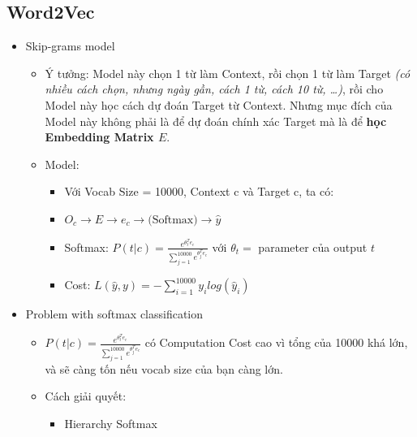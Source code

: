 \documentclass[12pt,a4paper]{report}
\begin{document}
		\subsection{Word2Vec}
			\begin{itemize}
			\item Skip-grams model
				\begin{itemize}
				\item Ý tưởng: Model này chọn 1 từ làm Context, rồi chọn 1 từ làm Target \textit{(có nhiều cách chọn, nhưng ngày gần, cách 1 từ, cách 10 từ, \dots)}, rồi cho Model này học cách dự đoán Target từ Context. Nhưng mục đích của Model này không phải là để dự đoán chính xác Target mà là để \textbf{học Embedding Matrix $E$}.
				\item Model: 
					\begin{itemize}
					\item Với Vocab Size = 10000, Context c và Target c, ta có:
					\item $O_c \rightarrow E \rightarrow e_c \rightarrow \text{(Softmax)} \rightarrow \hat{y}$
					\item Softmax: $P(t|c)=\frac{e^{\theta^T_t e_c}}{\sum^{10000}_{j=1}e^{\theta^T_j e_c}}$ với $\theta_t = $ parameter của output $t$
					\item Cost: $L(\hat{y},y)=-\sum_{i=1}^{10000}y_ilog(\hat{y}_i)$
					\end{itemize}
				\end{itemize}
			\item Problem with softmax classification
				\begin{itemize}
				\item $P(t|c)=\frac{e^{\theta^T_t e_c}}{\sum^{10000}_{j=1}e^{\theta^T_j e_c}}$ có Computation Cost cao vì tổng của 10000 khá lớn, và sẽ càng tốn nếu vocab size của bạn càng lớn.
				\item Cách giải quyết:
					\begin{itemize}
					\item Hierarchy Softmax
					\end{itemize}
				\end{itemize}
			\end{itemize}
\end{document}
